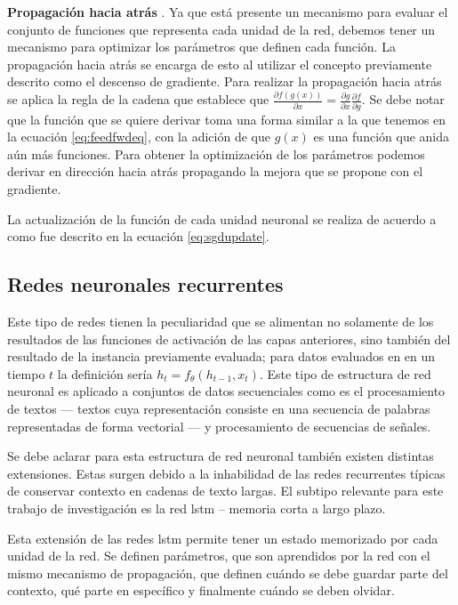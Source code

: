 \textbf{Propagación hacia atrás} \parencite{rumelhart1986learning}. Ya que está presente un mecanismo para evaluar el conjunto de funciones que representa cada unidad de la red, debemos tener un mecanismo para optimizar los parámetros que definen cada función. La propagación hacia atrás se encarga de esto al utilizar el concepto previamente descrito como el descenso de gradiente. Para realizar la propagación hacia atrás se aplica la regla de la cadena que establece que $\frac{\partial f(g(x))}{\partial x} = \frac{\partial g}{\partial x} \frac{\partial f}{\partial g}$. Se debe notar que la función que se quiere derivar toma una forma similar a la que tenemos en la ecuación \ref{eq:feedfwdeq}, con la adición de que $g(x)$ es una función que anida aún más funciones. Para obtener la optimización de los parámetros podemos derivar en dirección hacia atrás propagando la mejora que se propone con el gradiente.

La actualización de la función de cada unidad neuronal se realiza de acuerdo a como fue descrito en la ecuación \ref{eq:sgdupdate}.

\subsection{Redes neuronales recurrentes}



Este tipo de redes tienen la peculiaridad que se alimentan no solamente de los resultados de las funciones de activación de las capas anteriores, sino también del resultado de la instancia previamente evaluada; para datos evaluados en en un tiempo $t$ la definición sería $h_t = f_{\theta}(h_{t-1}, x_t)$. Este tipo de estructura de red neuronal es aplicado a conjuntos de datos secuenciales como es el procesamiento de textos --- textos cuya representación consiste en una secuencia de palabras representadas de forma vectorial --- y procesamiento de secuencias de señales.

Se debe aclarar para esta estructura de red neuronal también existen distintas extensiones. Estas surgen debido a la inhabilidad de las redes recurrentes típicas de conservar contexto en cadenas de texto largas. El subtipo relevante para este trabajo de investigación es la red \gls{lstm} -- memoria corta a largo plazo. 

Esta extensión de las redes \gls{lstm} permite tener un estado memorizado por cada unidad de la red. Se definen parámetros, que son aprendidos por la red con el mismo mecanismo de propagación, que definen cuándo se debe guardar parte del contexto, qué parte en específico y finalmente cuándo se deben olvidar.

